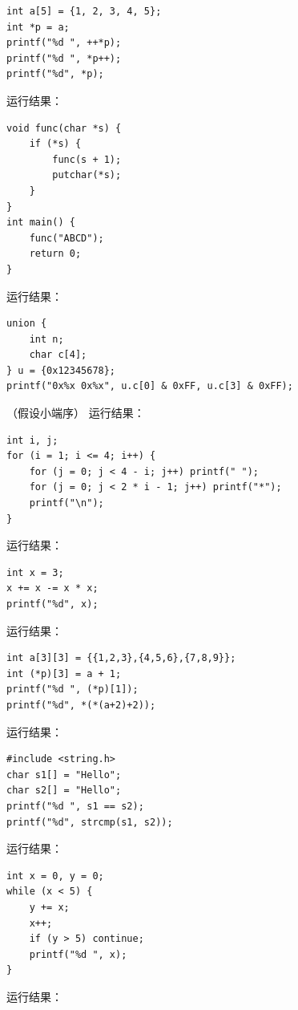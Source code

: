 \documentclass[a4paper,11pt]{article}
\begin{document}
\q
\begin{lstlisting}[language={[custom]C}]
int a[5] = {1, 2, 3, 4, 5};
int *p = a;
printf("%d ", ++*p);
printf("%d ", *p++);
printf("%d", *p);
\end{lstlisting}
运行结果：\underline{\hspace{3cm}}


\q
\begin{lstlisting}[language={[custom]C}]
void func(char *s) {
    if (*s) {
        func(s + 1);
        putchar(*s);
    }
}
int main() {
    func("ABCD");
    return 0;
}
\end{lstlisting}
运行结果：\underline{\hspace{3cm}}


\q
\begin{lstlisting}[language={[custom]C}]
union {
    int n;
    char c[4];
} u = {0x12345678};
printf("0x%x 0x%x", u.c[0] & 0xFF, u.c[3] & 0xFF);
\end{lstlisting}
（假设小端序）
运行结果：\underline{\hspace{3cm}}


\q
\begin{lstlisting}[language={[custom]C}]
int i, j;
for (i = 1; i <= 4; i++) {
    for (j = 0; j < 4 - i; j++) printf(" ");
    for (j = 0; j < 2 * i - 1; j++) printf("*");
    printf("\n");
}
\end{lstlisting}
运行结果：\underline{\hspace{3cm}}


\q
\begin{lstlisting}[language={[custom]C}]
int x = 3;
x += x -= x * x;
printf("%d", x);
\end{lstlisting}
运行结果：\underline{\hspace{3cm}}


\q
\begin{lstlisting}[language={[custom]C}]
int a[3][3] = {{1,2,3},{4,5,6},{7,8,9}};
int (*p)[3] = a + 1;
printf("%d ", (*p)[1]);
printf("%d", *(*(a+2)+2));
\end{lstlisting}
运行结果：\underline{\hspace{3cm}}


\q
\begin{lstlisting}[language={[custom]C}]
#include <string.h>
char s1[] = "Hello";
char s2[] = "Hello";
printf("%d ", s1 == s2);
printf("%d", strcmp(s1, s2));
\end{lstlisting}
运行结果：\underline{\hspace{3cm}}


\q
\begin{lstlisting}[language={[custom]C}]
int x = 0, y = 0;
while (x < 5) {
    y += x;
    x++;
    if (y > 5) continue;
    printf("%d ", x);
}
\end{lstlisting}
运行结果：\underline{\hspace{3cm}}
\end{document}
